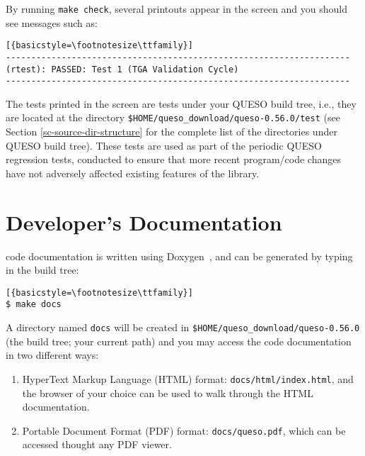 
By running \texttt{make check}, several printouts appear in the screen and you should see messages such as:
\begin{lstlisting}[{basicstyle=\footnotesize\ttfamily}]
--------------------------------------------------------------------
(rtest): PASSED: Test 1 (TGA Validation Cycle)
--------------------------------------------------------------------
\end{lstlisting}

The tests printed in  the screen are tests under your QUESO build tree, i.e., they are located at the  directory \verb+$HOME/queso_download/queso-0.56.0/test+ (see Section \ref{sc-source-dir-structure} for the complete list of the directories under QUESO build tree).
These tests are used as part of the periodic QUESO regression tests, conducted to ensure that more recent program/code changes have not adversely affected existing features of the library.



\section{\Queso{} Developer's Documentation}\label{sec:Queso_docs}



\Queso{} code documentation is written using Doxygen~\cite{Doxygen}, and can be generated by typing in the build tree:
\begin{lstlisting}[{basicstyle=\footnotesize\ttfamily}]
$ make docs
\end{lstlisting}

A directory named \verb+docs+ will be created in \verb+$HOME/queso_download/queso-0.56.0+ (the build tree; your current path) and you may access the code documentation in two different ways:
\begin{enumerate}
 \item HyperText Markup Language (HTML)  format: \verb+docs/html/index.html+, and the browser of your choice can be used to walk through the HTML documentation.

\item Portable Document Format (PDF) format: \verb+docs/queso.pdf+, which can be accessed thought any PDF viewer.
\end{enumerate}
%


